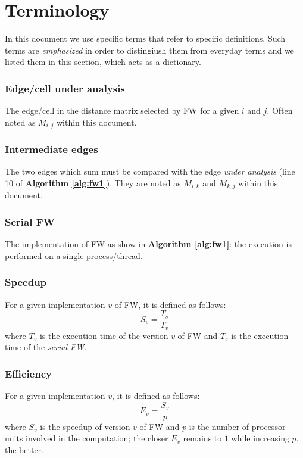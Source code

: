 \section{Terminology}
In this document we use specific terms that refer to specific definitions. Such terms are \emph{emphasized} in order to distingiush them from everyday terms
and we listed them in this section, which acts as a dictionary.

\subsubsection*{Edge/cell under analysis} 
The edge/cell in the distance matrix selected by FW for a given $i$ and $j$. Often noted as $M_{i,j}$ within this document.

\subsubsection*{Intermediate edges} 
The two edges which sum must be compared with the edge \emph{under analysis} (line 10 of \textbf{Algorithm \ref*{alg:fw1}}).
They are noted as $M_{i,k}$ and $M_{k,j}$ within this document.

\subsubsection*{Serial FW} 
The implementation of FW as show in \textbf{Algorithm \ref*{alg:fw1}}: the execution is performed on a single process/thread.

\subsubsection*{Speedup}
For a given implementation $v$ of FW, it is defined as follows:
\[S_{v} = \frac{T_{s}}{T_{v}}\]
where $T_v$ is the execution time of the version $v$ of FW and $T_s$ is the execution time of the \emph{serial FW}. 

\subsubsection*{Efficiency}
For a given implementation $v$, it is defined as follows:
\[E_v = \frac{S_v}{p}\]
where $S_v$ is the speedup of version $v$ of FW and $p$ is the number of processor units involved in the computation; the closer $E_v$ remains to $1$ while increasing $p$, the better.